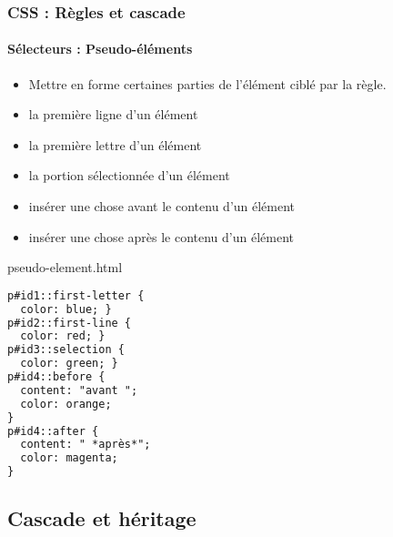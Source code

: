 \documentclass[xcolor=table]{beamer}
\begin{document}
\begin{frame}[fragile]
\frametitle{CSS : Règles et cascade}
\framesubtitle{Sélecteurs : Pseudo-éléments}

\begin{minipage}{0.60\textwidth} 
	\begin{itemize}
		\item Mettre en forme certaines parties de l'élément ciblé par la règle.
		\item {} la première ligne d'un élément
		\item {} la première lettre d'un élément
		\item {} la portion sélectionnée d'un élément
		\item {} insérer une chose avant le contenu d'un élément
		\item {} insérer une chose après le contenu d'un élément
	\end{itemize}
\end{minipage}
%
\begin{minipage}{0.38\textwidth}
\begin{exampleblock}{pseudo-element.html}
\lstset{escapeinside=**}
\scriptsize\bfseries
\begin{lstlisting}[language={html}]
p#id1::first-letter {
  color: blue; }
p#id2::first-line {
  color: red; }
p#id3::selection {
  color: green; }
p#id4::before {
  content: "avant ";
  color: orange;
}
p#id4::after {
  content: " *après*";
  color: magenta;
}
\end{lstlisting}
\end{exampleblock}
\end{minipage}
\end{frame}

\subsection{Cascade et héritage}

%
%
\end{document}
